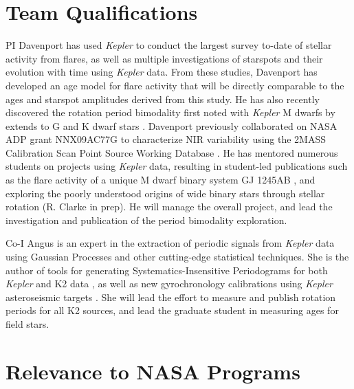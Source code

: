\documentclass[12pt]{article}
\newcommand{\Kepler}{\textsl{Kepler}\xspace}
\begin{document}
\section{Team Qualifications}
PI Davenport has used \Kepler to conduct the largest survey to-date of stellar activity from flares, as well as multiple investigations of starspots and their evolution with time using \Kepler data. From these studies, Davenport has developed an age model for flare activity that will be directly comparable to the ages and starspot amplitudes derived from this study. He has also recently discovered the rotation period bimodality first noted with \Kepler M dwarfs by \citet{mcquillan2013} extends to G and K dwarf stars \citep{davenport2017}.
Davenport previously collaborated on NASA ADP grant NNX09AC77G to characterize NIR variability using the 2MASS Calibration Scan Point Source Working Database \citep{davenport2012,davenport2015a}.
He has mentored numerous students on projects using \Kepler data, resulting in student-led publications such as the flare activity of a unique M dwarf binary system GJ 1245AB \citep{lurie2015}, and exploring the poorly understood origins of wide binary stars through stellar rotation (R. Clarke in prep). He will manage the overall project, and lead the investigation and publication of the period bimodality exploration. 

Co-I Angus is an expert in the extraction of periodic signals from \Kepler data using Gaussian Processes \citep{angus2016c} and other cutting-edge statistical techniques. She is the author of tools for generating Systematics-Insensitive Periodograms for both \Kepler and K2 data \citep{angus2016}, as well as new gyrochronology calibrations using \Kepler asteroseismic targets \citep{angus2015}. She will lead the effort to measure and publish rotation periods for all K2 sources, and lead the graduate student in measuring ages for field stars.



\section{Relevance to NASA Programs}






\clearpage


\end{document}
